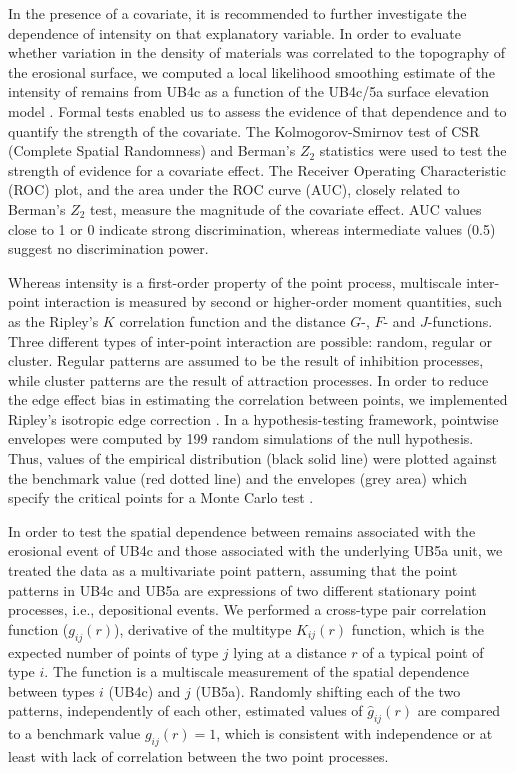 \documentclass[preprint,authoryear,times]{elsarticle} %
\begin{document}
In the presence of a covariate, it is recommended to further investigate the dependence of intensity on that explanatory variable. In order to evaluate whether variation in the density of materials was correlated to the topography of the erosional surface, we computed a local likelihood smoothing estimate of the intensity of remains from UB4c as a function of the UB4c/5a surface elevation model \citep{Baddeley2012}. Formal tests enabled us to assess the evidence of that dependence and to quantify the strength of the covariate. The Kolmogorov-Smirnov test of CSR (Complete Spatial Randomness) and Berman's $Z_2$ statistics were used to test the strength of evidence for a covariate effect. The Receiver Operating Characteristic (ROC) plot, and the area under the ROC curve (AUC), closely related to Berman's $Z_2$ test, measure the magnitude of the covariate effect. AUC values close to 1 or 0 indicate strong discrimination, whereas intermediate values (0.5) suggest no discrimination power.

Whereas intensity is a first-order property of the point process, multiscale inter-point interaction is measured by second or higher-order moment quantities, such as the Ripley's $K$ correlation function \citep{Ripley1976,Ripley1977} and the distance $G$-, $F$- and $J$-functions. Three different types of inter-point interaction are possible: random, regular or cluster. Regular patterns are assumed to be the result of inhibition processes, while cluster patterns are the result of attraction processes. In order to reduce the edge effect bias in estimating the correlation between points, we implemented Ripley's isotropic edge correction \citep{Ohser1983,Ripley1988}. In a hypothesis-testing framework, pointwise envelopes were computed by 199 random simulations of the null hypothesis. Thus, values of the empirical distribution (black solid line) were plotted against the benchmark value (red dotted line) and the envelopes (grey area) which specify the critical points for a Monte Carlo test \citep{Ripley1981}.

In order to test the spatial dependence between remains associated with the erosional event of UB4c and those associated with the underlying UB5a unit, we treated the data as a multivariate point pattern, assuming that the point patterns in UB4c and UB5a are expressions of two different stationary point processes, i.e., depositional events. We performed a cross-type pair correlation function ($g_{ij}(r)$), derivative of the multitype $K_{ij}(r)$ function, which is the expected number of points of type $j$ lying at a distance $r$ of a typical point of type $i$. The function is a multiscale measurement of the spatial dependence between types $i$ (UB4c) and $j$ (UB5a). Randomly shifting each of the two patterns, independently of each other, estimated values of $\hat{g}_{ij}(r)$ are compared to a benchmark value $g_{ij}(r)=1$, which is consistent with independence or at least with lack of correlation between the two point processes.
\end{document}
